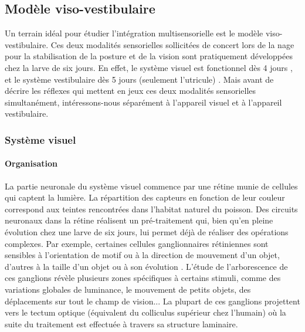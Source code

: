 


\subsection{Modèle viso-vestibulaire}

Un terrain idéal pour étudier l'intégration multisensorielle est le modèle viso-vestibulaire. Ces deux modalités sensorielles sollicitées de concert lors de la nage pour la stabilisation de la posture et de la vision sont pratiquement développées chez la larve de six jours. En effet, le système visuel est fonctionnel dès 4 jours \cite{bollmann_zebrafish_2019}, et le système vestibulaire dès 5 jours (seulement l'utricule) \cite{haddon_early_1996}. Mais avant de décrire les réflexes qui mettent en jeux ces deux modalités sensorielles simultanément, intéressons-nous séparément à l'appareil visuel et à l'appareil vestibulaire.

\subsubsection{Système visuel}

\paragraph{Organisation}
La partie neuronale du système visuel commence par une rétine munie de cellules qui captent la lumière. La répartition des capteurs en fonction de leur couleur correspond aux teintes rencontrées dans l'habitat naturel du poisson. Des circuits neuronaux dans la rétine réalisent un pré-traitement qui, bien qu'en pleine évolution chez une larve de six jours, lui permet déjà de réaliser des opérations complexes. Par exemple, certaines cellules ganglionnaires rétiniennes sont sensibles à l'orientation de motif ou à la direction de mouvement d'un objet, d'autres à la taille d'un objet ou à son évolution \cite{bollmann_zebrafish_2019}. L'étude de l'arborescence de ces ganglions révèle plusieurs zones spécifiques à certains stimuli, comme des variations globales de luminance, le mouvement de petits objets, des déplacements sur tout le champ de vision... La plupart de ces ganglions projettent vers le tectum optique (équivalent du colliculus supérieur chez l'humain) où la suite du traitement est effectuée à travers sa structure laminaire.

